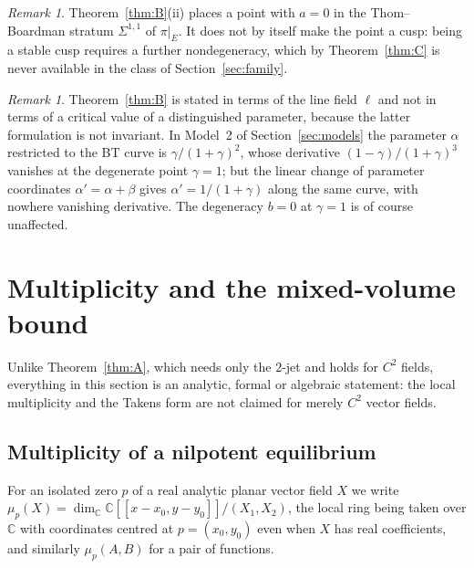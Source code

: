 \documentclass[12pt]{article}
\theoremstyle{plain}
\theoremstyle{definition}
\theoremstyle{remark}
\newtheorem{remark}[theorem]{Remark}
\newcommand{\C}{\mathbb{C}}
\begin{document}
	\begin{remark}\label{rem:thomboardman}
		Theorem~\ref{thm:B}(ii) places a point with $a=0$ in the
		Thom--Boardman stratum $\Sigma^{1,1}$ of $\pi|_{E}$.  It does not by
		itself make the point a cusp: being a stable cusp requires a further
		nondegeneracy, which by Theorem~\ref{thm:C} is never available in the
		class of Section~\ref{sec:family}.
	\end{remark}
	
	\begin{remark}\label{rem:notextremum}
		Theorem~\ref{thm:B} is stated in terms of the line field $\ell$ and not
		in terms of a critical value of a distinguished parameter, because the
		latter formulation is not invariant.  In Model~2 of
		Section~\ref{sec:models} the parameter $\alpha$ restricted to the BT
		curve is $\gamma/(1+\gamma)^{2}$, whose derivative
		$(1-\gamma)/(1+\gamma)^{3}$ vanishes at the degenerate point
		$\gamma=1$; but the linear change of parameter coordinates
		$\alpha'=\alpha+\beta$ gives $\alpha'=1/(1+\gamma)$ along the same
		curve, with nowhere vanishing derivative.  The degeneracy $b=0$ at
		$\gamma=1$ is of course unaffected.
	\end{remark}
	
	
	\section{Multiplicity and the mixed-volume bound}
	\label{sec:mult}
	
	Unlike Theorem~\ref{thm:A}, which needs only the $2$-jet and holds for
	$C^{2}$ fields, everything in this section is an analytic, formal or
	algebraic statement: the local multiplicity and the Takens form are not
	claimed for merely $C^{2}$ vector fields.
	
	
	\subsection{Multiplicity of a nilpotent equilibrium}
	
	For an isolated zero $p$ of a real analytic planar vector field $X$ we
	write $\mu_{p}(X)=\dim_{\C}\C[[x-x_{0},y-y_{0}]]/(X_{1},X_{2})$, the
	local ring being taken over $\C$ with coordinates centred at
	$p=(x_{0},y_{0})$ even when $X$ has real coefficients, and similarly
	$\mu_{p}(A,B)$ for a pair of functions.
	
\end{document}
